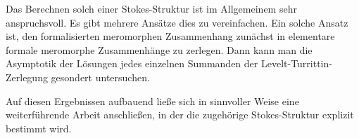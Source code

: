 Das Berechnen solch einer Stokes-Struktur ist im Allgemeinem sehr
anspruchsvoll.
Es gibt mehrere Ansätze dies zu vereinfachen. Ein solche Ansatz ist, den
formalisierten meromorphen Zusammenhang zunächst in elementare formale
meromorphe Zusammenhänge zu zerlegen.
Dann kann man die Asymptotik der Lösungen jedes einzelnen Summanden der
Levelt-Turrittin-Zerlegung gesondert untersuchen.
\begin{comment}
Ein Versuch, dies zu vereinfachen ist, den fraglichen meromorphen Zusammenhang
zunächst, wie hier, in elementare meromorphe Zusammenhänge zu zerlegen und
schließlich die Asymptotik der zugehörigen Lösungen zu betrachten.
\end{comment}
Auf diesen Ergebnissen aufbauend ließe sich in sinnvoller Weise eine
weiterführende Arbeit anschließen, in der die zugehörige Stokes-Struktur
explizit bestimmt wird.

\begin{comment}
Stokes Struktur ausrechen? Dazu die Lösung asymptotisch approximieren
$\rightsquigarrow$ offensichtlich schwer\\
deshalb suche andere Lösung
\end{comment}
\begin{comment}
Als nächstes könnte man die Stokes Struktur des zerlegten meromorphen
Zusammenhangs zu berechnen.
Dazu möchte man die Lösungen der einzelnen Summanden asymptotisch
approximieren. 
\end{comment}


